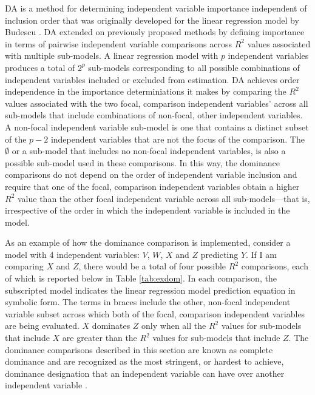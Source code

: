 \documentclass[man]{apa7}
\begin{document}
	DA is a method for determining independent variable importance independent of inclusion order that was originally developed for the linear regression model by Budescu \parencite*{budescu1993dominance}.
	DA extended on previously proposed methods by defining importance in terms of pairwise independent variable comparisons across $R^2$ values associated with multiple sub-models.
	A linear regression model with $p$ independent variables produces a total of $2^p$ sub-models corresponding to all possible combinations of independent variables included or excluded from estimation.
	DA achieves order independence in the importance determiniations it makes by comparing the $R^2$ values associated with the two focal, comparison independent variables' across all sub-models that include combinations of non-focal, other independent variables. 
	A non-focal independent variable sub-model is one that contains a distinct subset of the $p - 2$ independent variables that are not the focus of the comparison.
	The $\emptyset$ or a sub-model that includes no non-focal independent variables, is also a possible sub-model used in these comparisons.	
	In this way, the dominance comparisons do not depend on the order of independent variable inclusion and require that one of the focal, comparison independent variables obtain a higher $R^2$ value than the other focal independent variable across all sub-models---that is, irrespective of the order in which the independent variable is included in the model.
	
	As an example of how the dominance comparison is implemented, consider a model with 4 independent variables: $V$, $W$, $X$ and $Z$ predicting $Y$.
	If I am comparing $X$ and $Z$, there would be a total of four possible $R^2$ comparisons, each of which is reported below in Table \ref{tab:exdom}.
	In each comparison, the subscripted model indicates the linear regression model prediction equation in symbolic form.
	The terms in braces include the other, non-focal independent variable subset across which both of the focal, comparison independent variables are being evaluated.
	$X$ dominates $Z$ only when all the $R^2$ values for sub-models that include $X$ are greater than the $R^2$ values for sub-models that include $Z$.
	The dominance comparisons described in this section are known as complete dominance and are recognized as the most stringent, or hardest to achieve, dominance designation that an independent variable can have over another independent variable \parencite{azen2003dominance}.	
\end{document}
